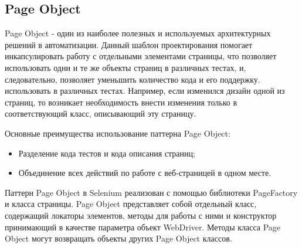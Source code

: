 \documentclass[a4paper]{article}
\begin{document}
    \subsection{Page Object}
    Page Object - один из наиболее полезных и используемых архитектурных решений в автоматизации. Данный шаблон проектирования помогает инкапсулировать работу с отдельными элементами страницы, что позволяет использовать одни и те же объекты страниц в различных тестах, и, следовательно, позволяет уменьшить количество кода и его поддержку. использовать в различных тестах. Например, если изменился дизайн одной из страниц, то возникает необходимость внести изменения только в соответствующий класс, описывающий эту страницу. \par
    Основные преимущества использование паттерна Page Object:
    \begin{itemize}
        \item Разделение кода тестов и кода описания страниц;
        \item Объединение всех действий по работе с веб-страницей в одном месте.
    \end{itemize} \par
    Паттерн Page Object в Selenium реализован с помощью библиотеки PageFactory и класса страницы. Page Object представляет собой отдельный класс, содержащий локаторы элементов, методы для работы с ними и конструктор принимающий в качестве параметра объект WebDriver. Методы класса Page Object могут возвращать объекты других Page Object классов.
\end{document}
